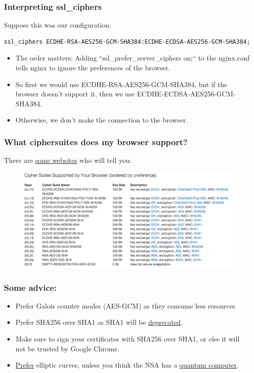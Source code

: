 \documentclass[9pt]{beamer}
\begin{document}
\begin{frame}[fragile]
\frametitle{Interpreting ssl\_ciphers}
Suppose this was our configuration:
\begin{verbatim}
ssl_ciphers ECDHE-RSA-AES256-GCM-SHA384:ECDHE-ECDSA-AES256-GCM-SHA384;
\end{verbatim}
\begin{itemize}
\item The order matters: Adding ``ssl\_prefer\_server\_ciphers on;`` to the nginx.conf tells nginx to ignore the preferences of the browser.
\pause
\item So first we would use ECDHE-RSA-AES256-GCM-SHA384, but if the browser doesn't support it, then we use ECDHE-ECDSA-AES256-GCM-SHA384.
\pause
\item Otherwise, we don't make the connection to the browser.
\end{itemize}
\end{frame}


\begin{frame}
\frametitle{What ciphersuites does my browser support?}
There are \href{https://cc.dcsec.uni-hannover.de/}{some websites} who will tell you:
\begin{figure}
\includegraphics[scale=0.25]{figures/browserciphersuites.png}
\end{figure}
\end{frame}

\begin{frame}[fragile]
\frametitle{Some advice:}
\begin{itemize}
\item Prefer Galois counter modes (AES-GCM) as they consume less resources
\pause
\item Prefer SHA256 over SHA1 as SHA1 will be \href{http://googleonlinesecurity.blogspot.com/2014/09/gradually-sunsetting-sha-1.html}{deprecated}.
\pause
\item Make sure to sign your certificates with SHA256 over SHA1, or else it will not be trusted by Google Chrome.
\pause
\item \href{https://www.nsa.gov/business/programs/elliptic_curve.shtml}{Prefer} elliptic curves, unless you think the NSA has a \href{https://en.wikipedia.org/wiki/Elliptic_curve_cryptography}{quantum computer}.
\end{itemize}
\end{frame}
\end{document}
